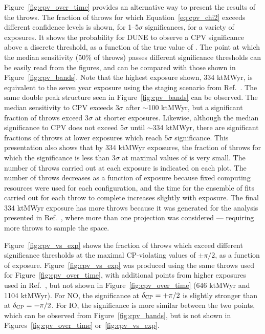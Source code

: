
Figure~\ref{fig:cpv_over_time} provides an alternative way to present the results of the throws. The fraction of throws for which Equation~\ref{eq:cpv_chi2} exceeds different confidence levels is shown, for 1--5$\sigma$ significances, for a variety of exposures. It shows the probability for DUNE to observe a CPV significance above a discrete threshold, as a function of the true value of \deltacp. The point at which the median sensitivity (50\% of throws) passes different significance thresholds can be easily read from the figures, and can be compared with those shown in Figure~\ref{fig:cpv_bands}. Note that the highest exposure shown, 334 ktMWyr, is equivalent to the seven year exposure using the staging scenario from Ref.~\cite{Abi:2020qib}. The same double peak structure seen in Figure~\ref{fig:cpv_bands} can be observed. The median sensitivity to CPV exceeds 3$\sigma$ after $\sim$100 ktMWyr, but a significant fraction of throws exceed 3$\sigma$ at shorter exposures. Likewise, although the median significance to CPV does not exceed 5$\sigma$ until $\sim$334 ktMWyr, there are significant fractions of throws at lower exposures which reach $5\sigma$ significance. This presentation also shows that by 334 ktMWyr exposures, the fraction of throws for which the significance is less than 3$\sigma$ at maximal values of \deltacp is very small. The number of throws carried out at each exposure is indicated on each plot. The number of throws decreases as a function of exposure because fixed computing resources were used for each configuration, and the time for the ensemble of fits carried out for each throw to complete increases slightly with exposure. The final 334 ktMWyr exposure has more throws because it was generated for the analysis presented in Ref.~\cite{Abi:2020qib}, where more than one projection was considered --- requiring more throws to sample the space.

Figure~\ref{fig:cpv_vs_exp} shows the fraction of throws which exceed different significance thresholds at the maximal CP-violating values of $\pm\pi/2$, as a function of exposure. Figure~\ref{fig:cpv_vs_exp} was produced using the same throws used for Figure~\ref{fig:cpv_over_time}, with additional points from higher exposures used in Ref.~\cite{Abi:2020qib}, but not shown in Figure~\ref{fig:cpv_over_time} (646 ktMWyr and 1104 ktMWyr). For NO, the significance at $\delta_{\rm CP} = +\pi/2$ is slightly stronger than at $\delta_{\rm CP} = -\pi/2$. For IO, the significance is more similar between the two points, which can be observed from Figure~\ref{fig:cpv_bands}, but is not shown in Figures~\ref{fig:cpv_over_time} or~\ref{fig:cpv_vs_exp}.

